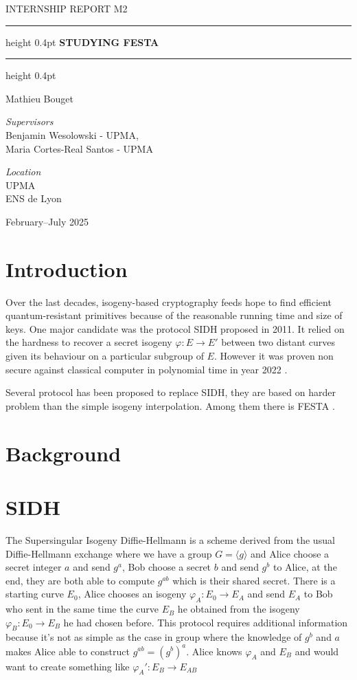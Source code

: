 \documentclass[12pt,a4paper]{article}
\newcommand{\reporttitle}[1]{%
	\vspace*{1cm} \begin{center} \large\MakeUppercase{#1}
\end{center} \vspace{1cm} }
\newcommand{\maintitle}[1]{%
	\begin{center} \hrule height 0.4pt\vspace{0.4em}
\Large\bfseries\MakeUppercase{#1}\\ \vspace{0.4em}\hrule height 0.4pt \end{center}
\vspace{1.5cm} }
\newcommand{\authorname}[1]{%
\begin{center} #1 \end{center} \vspace{1cm} }
\newcommand{\supervisors}[2]{%
	\begin{center} \textit{Supervisors}\\ #1,\\
	#2
\end{center} \vspace{1cm} }
\newcommand{\locationinfo}[2]{%
	\begin{center} \textit{Location}\\ #1\\ #2 \end{center}
\vfill }
\newcommand{\daterange}[1]{%
\begin{center} #1 \end{center} }
\begin{document}
	\reporttitle{Internship report M2}

	\maintitle{Studying FESTA}

	\authorname{Mathieu Bouget}

	\supervisors{Benjamin Wesolowski - UPMA}{Maria Cortes-Real Santos - UPMA}

	\locationinfo{UPMA}{ENS de Lyon}

	\daterange{February--July 2025}

	\newpage \setcounter{page}{1} \pagestyle{plain}

	\tableofcontents

	\section{Introduction}


	Over the last decades, isogeny-based cryptography feeds hope to find efficient
	quantum-resistant primitives because of the reasonable running time and size of keys. One
	major candidate was the protocol SIDH \cite{SIDH} proposed in 2011. It relied on the
	hardness to recover a secret isogeny $\varphi:E\to E'$ between
	two distant curves given its behaviour on a particular subgroup of $E$.
	However it was proven non secure against classical computer in polynomial time
	in year 2022 \cite{firstattacksidh}.

	Several protocol has been proposed to replace SIDH, they are based on harder problem than the
	simple isogeny interpolation. Among them there is FESTA \cite{FESTA}.



	\section{Background}
	\section{SIDH}
	The Supersingular Isogeny Diffie-Hellmann is a scheme derived from the usual
	Diffie-Hellmann exchange where we have a group $G= \langle g\rangle$ and Alice choose a
	secret integer $a$ and send $g^a$, Bob choose a secret $b$ and send $g^b$ to Alice,
	at the end, they are both able to compute $g^{ab}$ which is their shared secret.
	There is a starting curve $E_0$, Alice chooses an isogeny $\varphi_A:E_0\to E_A$
	and send $E_A$ to Bob who sent in the same time the curve $E_B$ he obtained
	from the isogeny $\varphi_B:E_0\to E_B$ he had chosen before.
	This protocol requires additional information because it's not as simple as the
	case in group where the knowledge of $g^b$ and $a$ makes Alice able to construct
	$g^{ab}=(g^b)^a$.
	Alice knows $\varphi_A$ and  $E_B$ and would want to create something like
	$\varphi_A':E_B\to E_{AB}$
\end{document}
